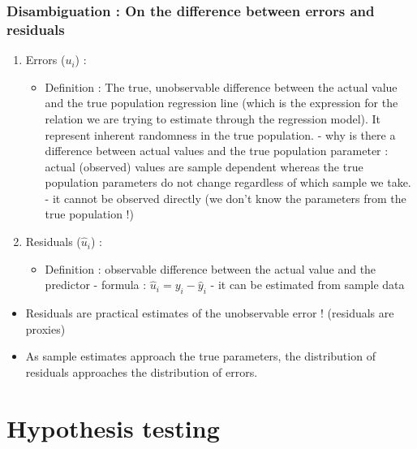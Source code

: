 \documentclass{article}
\begin{document}
\subsubsection{Disambiguation : On the difference between errors and residuals}
\begin{enumerate}
    \item Errors ($u_i$) : 
    \begin{itemize}
        \item Definition : The true, unobservable difference between the actual value and the true population regression line (which is the expression for the relation we are trying to estimate through the regression model). It represent inherent randomness in the true population.  
        \subitem - why is there a difference between actual values and the true population parameter : actual (observed) values are sample dependent whereas the true population parameters do not change regardless of which sample we take. 
        \subitem - it cannot be observed directly (we don't know the parameters from the true population !)
        
    \end{itemize}
    \item Residuals ($\hat{u}_i$) : 
    \begin{itemize}
        \item Definition : observable difference between the actual value and the predictor 
        \subitem - formula : $\hat{u}_i=y_i-\hat{y}_i$
        \subitem - it can be estimated from sample data
    \end{itemize}
\end{enumerate}
\begin{linkbox}
\begin{itemize}
    \item Residuals are practical estimates of the unobservable error ! (residuals are proxies)
    \item As sample estimates approach the true parameters, the distribution of residuals approaches the distribution of errors.
\end{itemize}    
\end{linkbox}


\section{Hypothesis testing}
\end{document}
